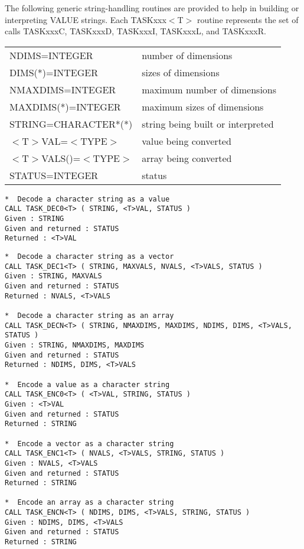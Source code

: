 \documentclass[twoside,11pt]{article}
\renewcommand{\_}{\texttt{\symbol{95}}}
\begin{document}
The following generic string-handling routines are provided to help in
building or interpreting VALUE strings. Each TASK\_xxx$<$T$>$ routine
represents the set of calls TASK\_xxxC, TASK\_xxxD, TASK\_xxxI, TASK\_xxxL,
and TASK\_xxxR.

\small
\begin{center}
\begin{tabular}{ll}
NDIMS=INTEGER            &    number of dimensions \\
DIMS(*)=INTEGER          &    sizes of dimensions \\
NMAXDIMS=INTEGER         &    maximum number of dimensions \\
MAXDIMS(*)=INTEGER       &    maximum sizes of dimensions \\
STRING=CHARACTER*(*)     &    string being built or interpreted \\
$<$T$>$VAL=$<$TYPE$>$    &    value being converted \\
$<$T$>$VALS()=$<$TYPE$>$ &    array being converted \\
STATUS=INTEGER           &    status \\
\end{tabular}
\end{center}
\normalsize

\begin{verbatim}
*  Decode a character string as a value
CALL TASK_DEC0<T> ( STRING, <T>VAL, STATUS )
Given : STRING
Given and returned : STATUS
Returned : <T>VAL
\end{verbatim}
\newpage
\begin{verbatim}
*  Decode a character string as a vector
CALL TASK_DEC1<T> ( STRING, MAXVALS, NVALS, <T>VALS, STATUS )
Given : STRING, MAXVALS
Given and returned : STATUS
Returned : NVALS, <T>VALS

*  Decode a character string as an array
CALL TASK_DECN<T> ( STRING, NMAXDIMS, MAXDIMS, NDIMS, DIMS, <T>VALS, STATUS )
Given : STRING, NMAXDIMS, MAXDIMS
Given and returned : STATUS
Returned : NDIMS, DIMS, <T>VALS

*  Encode a value as a character string
CALL TASK_ENC0<T> ( <T>VAL, STRING, STATUS )
Given : <T>VAL
Given and returned : STATUS
Returned : STRING

*  Encode a vector as a character string
CALL TASK_ENC1<T> ( NVALS, <T>VALS, STRING, STATUS )
Given : NVALS, <T>VALS
Given and returned : STATUS
Returned : STRING

*  Encode an array as a character string
CALL TASK_ENCN<T> ( NDIMS, DIMS, <T>VALS, STRING, STATUS )
Given : NDIMS, DIMS, <T>VALS
Given and returned : STATUS
Returned : STRING
\end{verbatim}
\end{document}
